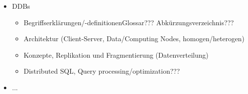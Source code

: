 \begin{itemize}
    \item DDBs
    \begin{itemize}
        \item Begriffserklärungen/-definitionen\textrightarrow Glossar??? Abkürzungsverzeichnis???
        \item Architektur (Client-Server, Data/Computing Nodes, homogen/heterogen)
        \item Konzepte, Replikation und Fragmentierung (Datenverteilung)
        \item Distributed SQL, Query processing/optimization???
    \end{itemize}
    
    \item ...
\end{itemize}




\listoftodos